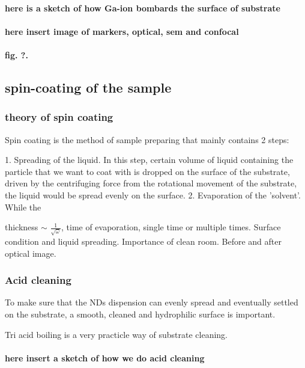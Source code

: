\paragraph{here is a sketch of how Ga-ion bombards the surface of substrate}
\paragraph{here insert image of markers, optical, sem and confocal}
\paragraph{fig. ?.  }



\subsection{spin-coating of the sample}
\subsubsection{theory of spin coating} 
Spin coating is the method of sample preparing that mainly contains 2 steps:

1. Spreading of the liquid. In this step, certain volume of liquid containing the particle that we want to coat with is dropped on the surface of the substrate, driven by the centrifuging force from the rotational movement of the substrate, the liquid would be spread evenly on the surface.
2. Evaporation of the 'solvent'. While the 

thickness $\sim$ $\frac{1}{\sqrt{\omega}}$, time of evaporation, single time or multiple times. Surface condition and liquid spreading. Importance of clean room. Before and after optical image.
\subsubsection{Acid cleaning}
To make sure that the NDs dispension can evenly spread and eventually settled on the substrate, a smooth, cleaned and hydrophilic surface is important.

Tri acid boiling is a very practicle way of substrate cleaning.

\paragraph{here insert a sketch of how we do acid cleaning} 


